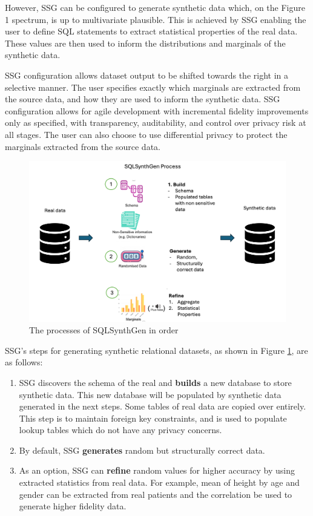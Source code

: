 \documentclass[11pt]{article}
\begin{document}
However, SSG can be configured to generate synthetic data which, on the Figure 1 spectrum, is up to multivariate plausible. This is achieved by SSG enabling the user to define SQL statements to extract statistical properties of the real data. These values are then used to inform the distributions and marginals of the synthetic data. 

SSG configuration allows dataset output to be shifted towards the right in a selective manner. The user specifies exactly which marginals are extracted from the source data, and how they are used to inform the synthetic data. SSG configuration allows for agile development with incremental fidelity improvements only as specified, with transparency, auditability, and control over privacy risk at all stages. The user can also choose to use differential privacy to protect the marginals extracted from the source data.

\begin{figure}[ht]
\centering
\includegraphics[width=0.8\linewidth]{figures/Process.png}
\caption{The processes of SQLSynthGen in order}
\label{fig:SSG Process}
\end{figure}

SSG's steps for generating synthetic relational datasets, as shown in Figure \ref{fig:SSG Process}, are as follows:

\begin{enumerate}
    \item SSG discovers the schema of the real and \textbf{builds} a new database to store synthetic data. This new database will be populated by synthetic data generated in the next steps. Some tables of real data are copied over entirely. This step is to maintain foreign key constraints, and is used to populate lookup tables which do not have any privacy concerns.
    \item By default, SSG \textbf{generates} random but structurally correct data. 
    \item As an option, SSG can \textbf{refine} random values for higher accuracy by using extracted statistics from real data. For example, mean of height by age and gender can be extracted from real patients and the correlation be used to generate higher fidelity data.
\end{enumerate}
\end{document}
